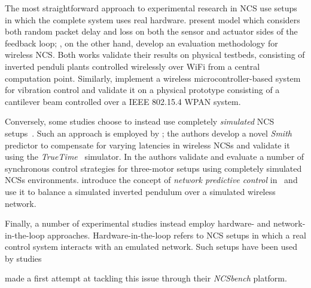 The most straightforward approach to experimental research in \ac{NCS} use setups in which the complete system uses real hardware.
\textcite{Drew2005NCSWLAN} present  model which considers both random packet delay and loss on both the sensor and actuator sides of the feedback loop; \textcite{Baumann2018LowPower}, on the other hand, develop an evaluation methodology for wireless \ac{NCS}.
Both works validate their results on physical testbeds, consisting of inverted penduli plants controlled wirelessly over WiFi from a central computation point.
Similarly, \textcite{Li2014Wireless} implement a wireless microcontroller-based system for vibration control and validate it on a physical prototype consisting of a cantilever beam controlled over a IEEE 802.15.4 \ac{WPAN} system.

Conversely, some studies choose to instead use completely \emph{simulated} \ac{NCS} setups~\cite{Andersson2005Simulation,Eyisi2012NCSWT}.
Such an approach is employed by \textcite{Du2009Smith}; the authors develop a novel \emph{Smith} predictor to compensate for varying latencies in wireless \acp{NCS} and validate it using the \emph{TrueTime}~\cite{Henriksson2002TrueTime} simulator.
In \textcite{Chen2015synccontrol} the authors validate and evaluate a number of synchronous control strategies for three-motor setups using completely simulated \acp{NCS} environments.
\citeauthor{Wu2012NPC} introduce the concept of \emph{network predictive control} in\ \cite{Wu2012NPC} and use it to balance a simulated inverted pendulum over a simulated wireless network.

Finally, a number of experimental studies instead employ hardware- and network-in-the-loop approaches.
Hardware-in-the-loop refers to \ac{NCS} setups in which a real control system interacts with an emulated network.
Such setups have been used by studies 



\textcite{Zoppi2020NCSBench} made a first attempt at tackling this issue through their \emph{NCSbench} platform.




